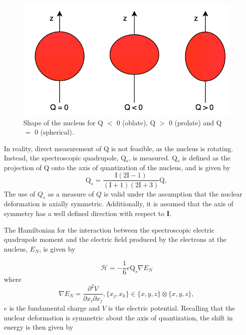 \begin{figure}[h]
\begin{center}
\includegraphics[width=\textwidth]{Graphics/Q_pic.png}
\caption[Oblate vs. Prolate vs. Spherical]{\small Shape of the nucleus for Q $<$ 0 (oblate), Q $>$ 0 (prolate) and Q $=$ 0 (spherical)\cite{wolf}.}
\label{Q}
\end{center}
\end{figure}

In reality, direct measurement of Q is not feasible, as the nucleus is rotating. Instead, the spectroscopic quadrupole, Q$_s$, is measured. Q$_s$ is defined as the projection of Q onto the axis of quantization of the nucleus, and is given by
\begin{equation}
\mathrm{Q}_s = \frac{\mathrm{I}(2\mathrm{I}-1)}{(\mathrm{I}+1)(2\mathrm{I}+3)}\mathrm{Q},
\end{equation}
The use of $Q_s$ as a measure of $Q$ is valid under the assumption that the nuclear deformation is axially symmetric. Additionally, it is assumed that the axis of symmetry has a well defined direction with respect to \textbf{I}.

The Hamiltonian for the interaction between the spectroscopic electric quadrupole moment and the electric field produced by the electrons at the nucleus, $E_N$, is given by

\begin{equation}
\mathcal{H} = - \frac{1}{6}e\mathrm{Q}_s\nabla{E_N}
\end{equation}
where
\begin{equation}
\nabla{E_N} = \frac{\partial^2V}{\partial x_i\partial x_j}, \{x_j,x_k\} \in \{x,y,z\} \otimes \{x,y,z\},
\end{equation}
$e$ is the fundamental charge and $V$ is the electric potential\cite{TomT}. Recalling that the nuclear deformation is symmetric about the axis of quantization, the shift in energy is then given by

